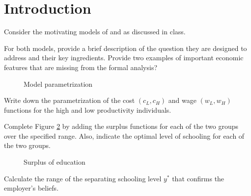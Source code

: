 \section{Introduction}
Consider the motivating models of \cite{Spence.1973} and \cite{Ben-Porath.1967} as discussed in class.

\begin{boenumerate}
\item For both models, provide a brief description of the question they are designed to address and their key ingredients. Provide two examples of important economic features that are missing from the formal analysis?\\


\begin{figure}[h]\centering
\caption{Model parametrization}\label{Model parametrization}
\end{figure}

\item Write down the parametrization of the cost $(c_L, c_H)$ and wage $(w_L, w_H)$ functions for the high and low productivity individuals.

\item Complete Figure \ref{Canvas Surplus} by adding the surplus functions for each of the two groups over the specified range. Also, indicate the optimal level of schooling for each of the two groups.

\begin{figure}[h]\centering
\caption{Surplus of education}\label{Canvas Surplus}
\end{figure}

\item Calculate the range of the separating schooling level $y^*$ that confirms the employer's beliefs.\\


\end{boenumerate}

